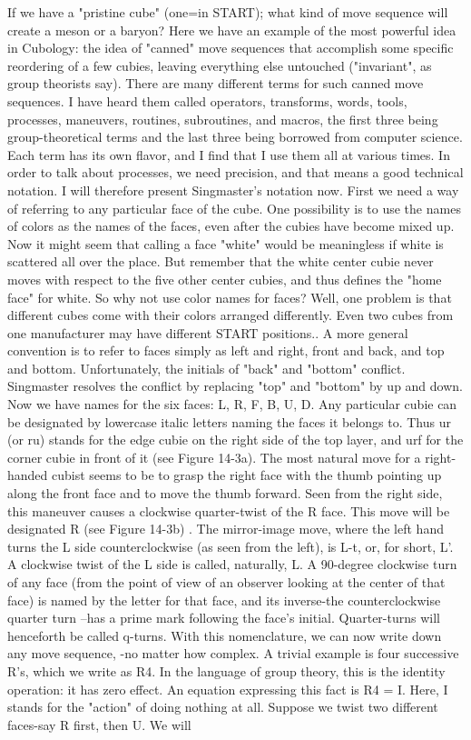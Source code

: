          If we have a "pristine cube" (one=in START); what kind of move sequence
will create a meson or a baryon? Here we have an example of the most powerful idea
in Cubology: the idea of "canned" move sequences that accomplish some specific
reordering of a few cubies, leaving everything else untouched ("invariant", as group
theorists say). There are many different terms for such canned move sequences. I have
heard them called operators, transforms, words, tools, processes, maneuvers, routines,
subroutines, and macros, the first three being group-theoretical terms and the last
three being borrowed from computer science. Each term has its own flavor, and I find
that I use them all at various times.
In order to talk about processes, we need precision, and that means a good technical
notation. I will therefore present Singmaster's notation now. First we need a way of
referring to any particular face of the cube. One possibility is to use the names of
colors as the names of the faces, even after the cubies have become mixed up. Now it
might seem that calling a face "white" would be meaningless if white is scattered all
over the place. But remember that the white center cubie never moves with respect to
the five other center cubies, and thus defines the "home face" for white. So why not
use color names for faces? Well, one problem is that different cubes come with their
colors arranged differently. Even two cubes from one manufacturer may have
different START positions.. A more general convention is to refer to faces simply as
left and right, front and back, and top and bottom. Unfortunately, the initials of "back"
and "bottom" conflict. Singmaster resolves the conflict by replacing "top" and
"bottom" by up and down. Now we have names for the six faces: L, R, F, B, U, D.
Any particular cubie can be designated by lowercase italic letters naming the faces it
belongs to. Thus ur (or ru) stands for the edge cubie on the right side of the top layer,
and urf for the corner cubie in front of it (see Figure 14-3a).
The most natural move for a right-handed cubist seems to be to grasp the right face
with the thumb pointing up along the front face and to move the thumb forward. Seen
from the right side, this maneuver causes a clockwise quarter-twist of the R face. This
move will be designated R (see Figure 14-3b)
.
The mirror-image move, where the left hand turns the L side counterclockwise (as
seen from the left), is L-t, or, for short, L'. A clockwise twist of the L side is called,
naturally, L. A 90-degree clockwise turn of any face (from the point of view of an
observer looking at the center of that face) is named by the letter for that face, and its
inverse-the counterclockwise quarter turn --has a prime mark following the face's
initial. Quarter-turns will henceforth be called q-turns.
With this nomenclature, we can now write down any move sequence, -no matter how
complex. A trivial example is four successive R's, which we write as R4. In the
language of group theory, this is the identity operation: it has zero effect. An equation
expressing this fact is R4 = I. Here, I stands for the "action" of doing nothing at all.
Suppose we twist two different faces-say R first, then U. We will




